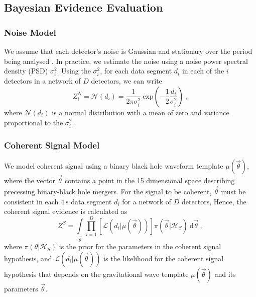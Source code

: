 \documentclass[%
preprint,
 amsmath,amssymb,
 aps,
]{revtex4}
\newcommand{\psd}{{\sc $\sigma^2_i$}\xspace}
\newcommand{\template}{{\sc $\mu(\vec{\theta})$}\xspace}
\newcommand{\parameters}{{\sc $\vec{\theta}$}\xspace}
\begin{document}
\subsection{Bayesian Evidence Evaluation}
\subsubsection{Noise Model}
We assume that each detector's noise is Gaussian and stationary over the period being analysed \cite{ligo_psd}. In practice, we estimate the noise using a noise power spectral density (PSD)  \psd. Using the \psd, for each data segment $d_i$ in each of the $i$ detectors in a network of $D$ detectors, we can write 
\begin{equation}
\label{eq:zn}
Z^N_i = \mathcal{N}(d_i) = \frac{1}{2\pi \sigma^2_i} \ \text{exp}\left(-\frac{1}{2} \frac{d_i}{\sigma^2_i} \right) \ ,
\end{equation}
where $\mathcal{N}(d_i)$ is a normal distribution with a mean of zero and variance proportional to the \psd. 

\subsubsection{Coherent Signal Model}
We model coherent signal using a binary black hole waveform template \template, where the vector \parameters contains a point in the 15 dimensional space describing precessing binary-black hole mergers. For the signal to be coherent, \parameters must be consistent in each $4\ \text{s}$ data segment $d_i$ for a network of $D$ detectors, Hence, the coherent signal evidence is calculated as
\begin{equation}
\label{eq:zs}
Z^S = \int\limits_{\vec{\theta}} \prod\limits^{D}_{i=1} \left[ \mathcal{L}(d_i|\mu(\vec{\theta}))\right] \pi(\vec{\theta}| \mathcal{H}_S)\  \text{d}\vec{\theta} \ ,
\end{equation}
where $\pi(\theta| \mathcal{H}_S)$ is the prior for the parameters in the coherent signal hypothesis, and $\mathcal{L}(d_i|\mu(\vec{\theta}))$ is the likelihood for the coherent signal hypothesis that depends on the gravitational wave template \template and its parameters \parameters. 
\end{document}
